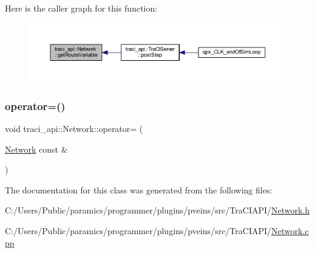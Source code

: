 Here is the caller graph for this function\+:\nopagebreak
\begin{figure}[H]
\begin{center}
\leavevmode
\includegraphics[width=350pt]{classtraci__api_1_1_network_abc0574b41332ec15856e2e5bb9926be9_icgraph}
\end{center}
\end{figure}
\mbox{\label{classtraci__api_1_1_network_ae6ac9267db1ace8c368a48a7b92ce964}} 
\subsubsection{\texorpdfstring{operator=()}{operator=()}}
{\footnotesize\ttfamily void traci\+\_\+api\+::\+Network\+::operator= (\begin{DoxyParamCaption}\item[{\hyperlink{classtraci__api_1_1_network}{Network} const \&}]{ }\end{DoxyParamCaption})\hspace{0.3cm}{\ttfamily [delete]}}



The documentation for this class was generated from the following files\+:\begin{DoxyCompactItemize}
\item 
C\+:/\+Users/\+Public/paramics/programmer/plugins/pveins/src/\+Tra\+C\+I\+A\+P\+I/\hyperlink{_network_8h}{Network.\+h}\item 
C\+:/\+Users/\+Public/paramics/programmer/plugins/pveins/src/\+Tra\+C\+I\+A\+P\+I/\hyperlink{_network_8cpp}{Network.\+cpp}\end{DoxyCompactItemize}
